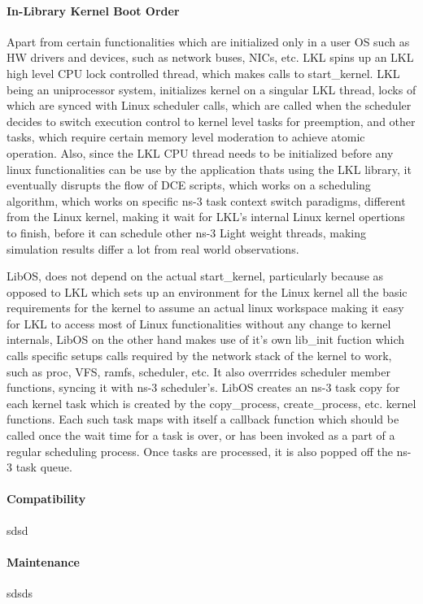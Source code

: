\documentclass{sig-alternate}
\begin{document}
\paragraph{In-Library Kernel Boot Order}
Apart from certain functionalities which are initialized only in a user OS such as HW drivers and devices,
such as network buses, NICs, etc. LKL spins up an LKL high level CPU lock controlled thread, which makes calls to 
start\_kernel. LKL being an uniprocessor system, initializes kernel on a singular LKL thread, locks of 
which are synced with Linux scheduler calls, which are called when the scheduler decides to switch execution control 
to kernel level tasks for preemption, and other tasks, which require certain memory level moderation to achieve
atomic operation. Also, since the LKL CPU thread needs to be initialized before any linux  functionalities can be use by the 
application thats using the LKL library, it eventually disrupts the flow of DCE scripts, which works on a 
scheduling algorithm, which works on specific ns-3 task context switch paradigms, different from the Linux kernel,
making it wait for LKL's internal Linux kernel opertions to finish, before it can schedule other ns-3 Light weight
threads, making simulation results differ a lot from real world observations.

LibOS, does not depend on the actual start\_kernel, particularly because as opposed to LKL which sets up an environment 
for the Linux kernel all the basic requirements for the kernel to assume an actual linux workspace making it easy 
for LKL to access most of Linux functionalities without any change to kernel internals, LibOS on the other hand makes 
use of it's own lib\_init fuction which calls specific setups calls required by the network stack of the kernel to 
work, such as proc, VFS, ramfs, scheduler, etc. It also overrrides scheduler member functions, syncing it with ns-3 
scheduler's. LibOS creates an ns-3 task copy for each kernel task which is created by the copy\_process, create\_process,
etc. kernel functions. Each such task maps with itself a callback function which should be called once the wait time
for a task is over, or has been invoked as a part of a regular scheduling process. Once tasks are processed, it is
also popped off the ns-3 task queue.
\paragraph{Compatibility}
sdsd
\paragraph{Maintenance}
sdsds
\end{document}
